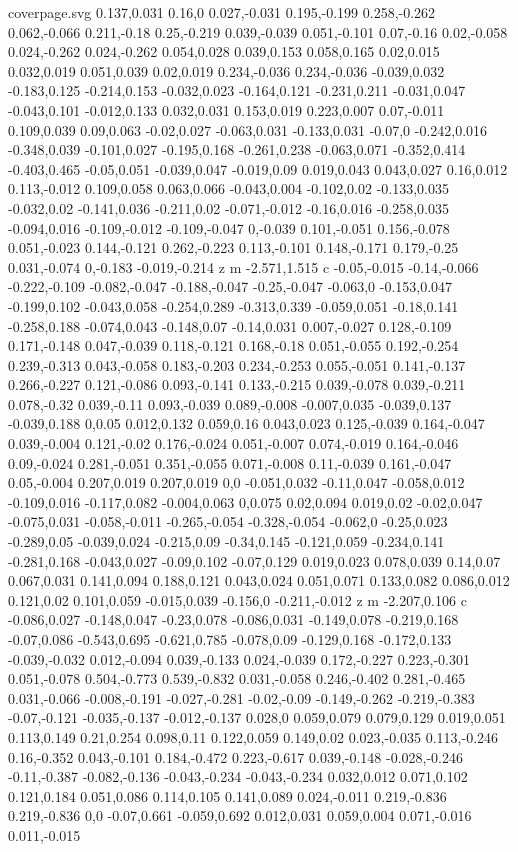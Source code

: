 \begin{filecontents}[noheader]{coverpage.svg}
0.137,0.031 0.16,0 0.027,-0.031 0.195,-0.199 0.258,-0.262 0.062,-0.066 0.211,-0.18 0.25,-0.219 0.039,-0.039 0.051,-0.101 0.07,-0.16 0.02,-0.058 0.024,-0.262 0.024,-0.262 0.054,0.028 0.039,0.153 0.058,0.165 0.02,0.015 0.032,0.019 0.051,0.039 0.02,0.019 0.234,-0.036 0.234,-0.036 -0.039,0.032 -0.183,0.125 -0.214,0.153 -0.032,0.023 -0.164,0.121 -0.231,0.211 -0.031,0.047 -0.043,0.101 -0.012,0.133 0.032,0.031 0.153,0.019 0.223,0.007 0.07,-0.011 0.109,0.039 0.09,0.063 -0.02,0.027 -0.063,0.031 -0.133,0.031 -0.07,0 -0.242,0.016 -0.348,0.039 -0.101,0.027 -0.195,0.168 -0.261,0.238 -0.063,0.071 -0.352,0.414 -0.403,0.465 -0.05,0.051 -0.039,0.047 -0.019,0.09 0.019,0.043 0.043,0.027 0.16,0.012 0.113,-0.012 0.109,0.058 0.063,0.066 -0.043,0.004 -0.102,0.02 -0.133,0.035 -0.032,0.02 -0.141,0.036 -0.211,0.02 -0.071,-0.012 -0.16,0.016 -0.258,0.035 -0.094,0.016 -0.109,-0.012 -0.109,-0.047 0,-0.039 0.101,-0.051 0.156,-0.078 0.051,-0.023 0.144,-0.121 0.262,-0.223 0.113,-0.101 0.148,-0.171 0.179,-0.25 0.031,-0.074 0,-0.183 -0.019,-0.214 z m -2.571,1.515 c -0.05,-0.015 -0.14,-0.066 -0.222,-0.109 -0.082,-0.047 -0.188,-0.047 -0.25,-0.047 -0.063,0 -0.153,0.047 -0.199,0.102 -0.043,0.058 -0.254,0.289 -0.313,0.339 -0.059,0.051 -0.18,0.141 -0.258,0.188 -0.074,0.043 -0.148,0.07 -0.14,0.031 0.007,-0.027 0.128,-0.109 0.171,-0.148 0.047,-0.039 0.118,-0.121 0.168,-0.18 0.051,-0.055 0.192,-0.254 0.239,-0.313 0.043,-0.058 0.183,-0.203 0.234,-0.253 0.055,-0.051 0.141,-0.137 0.266,-0.227 0.121,-0.086 0.093,-0.141 0.133,-0.215 0.039,-0.078 0.039,-0.211 0.078,-0.32 0.039,-0.11 0.093,-0.039 0.089,-0.008 -0.007,0.035 -0.039,0.137 -0.039,0.188 0,0.05 0.012,0.132 0.059,0.16 0.043,0.023 0.125,-0.039 0.164,-0.047 0.039,-0.004 0.121,-0.02 0.176,-0.024 0.051,-0.007 0.074,-0.019 0.164,-0.046 0.09,-0.024 0.281,-0.051 0.351,-0.055 0.071,-0.008 0.11,-0.039 0.161,-0.047 0.05,-0.004 0.207,0.019 0.207,0.019 0,0 -0.051,0.032 -0.11,0.047 -0.058,0.012 -0.109,0.016 -0.117,0.082 -0.004,0.063 0,0.075 0.02,0.094 0.019,0.02 -0.02,0.047 -0.075,0.031 -0.058,-0.011 -0.265,-0.054 -0.328,-0.054 -0.062,0 -0.25,0.023 -0.289,0.05 -0.039,0.024 -0.215,0.09 -0.34,0.145 -0.121,0.059 -0.234,0.141 -0.281,0.168 -0.043,0.027 -0.09,0.102 -0.07,0.129 0.019,0.023 0.078,0.039 0.14,0.07 0.067,0.031 0.141,0.094 0.188,0.121 0.043,0.024 0.051,0.071 0.133,0.082 0.086,0.012 0.121,0.02 0.101,0.059 -0.015,0.039 -0.156,0 -0.211,-0.012 z m -2.207,0.106 c -0.086,0.027 -0.148,0.047 -0.23,0.078 -0.086,0.031 -0.149,0.078 -0.219,0.168 -0.07,0.086 -0.543,0.695 -0.621,0.785 -0.078,0.09 -0.129,0.168 -0.172,0.133 -0.039,-0.032 0.012,-0.094 0.039,-0.133 0.024,-0.039 0.172,-0.227 0.223,-0.301 0.051,-0.078 0.504,-0.773 0.539,-0.832 0.031,-0.058 0.246,-0.402 0.281,-0.465 0.031,-0.066 -0.008,-0.191 -0.027,-0.281 -0.02,-0.09 -0.149,-0.262 -0.219,-0.383 -0.07,-0.121 -0.035,-0.137 -0.012,-0.137 0.028,0 0.059,0.079 0.079,0.129 0.019,0.051 0.113,0.149 0.21,0.254 0.098,0.11 0.122,0.059 0.149,0.02 0.023,-0.035 0.113,-0.246 0.16,-0.352 0.043,-0.101 0.184,-0.472 0.223,-0.617 0.039,-0.148 -0.028,-0.246 -0.11,-0.387 -0.082,-0.136 -0.043,-0.234 -0.043,-0.234 0.032,0.012 0.071,0.102 0.121,0.184 0.051,0.086 0.114,0.105 0.141,0.089 0.024,-0.011 0.219,-0.836 0.219,-0.836 0,0 -0.07,0.661 -0.059,0.692 0.012,0.031 0.059,0.004 0.071,-0.016 0.011,-0.015 
\end{filecontents}
